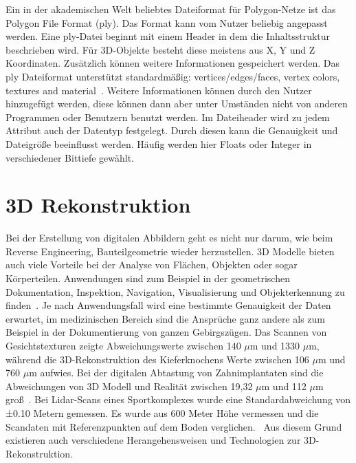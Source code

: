Ein in der akademischen Welt beliebtes Dateiformat für Polygon-Netze ist das 
Polygon File Format (ply).
Das Format kann vom Nutzer beliebig angepasst werden. Eine ply-Datei beginnt mit 
einem Header in dem die Inhaltsstruktur beschrieben wird. 
Für 3D-Objekte besteht diese meistens aus X, Y und Z Koordinaten. 
Zusätzlich können weitere Informationen gespeichert werden. Das ply Dateiformat 
unterstützt standardmäßig: \glqq vertices/edges/faces, vertex colors, textures and
material\grqq ~\cite{KentonMchenry.2008}. Weitere Informationen können durch den Nutzer 
hinzugefügt werden, 
diese können dann aber unter Umständen nicht von anderen Programmen oder Benutzern
benutzt werden.
Im Dateiheader wird zu jedem Attribut auch der Datentyp festgelegt. Durch diesen 
kann die Genauigkeit und Dateigröße beeinflusst werden. Häufig werden hier Floats oder
Integer in verschiedener Bittiefe gewählt.

\section{3D Rekonstruktion} \label{3d_construction}

Bei der Erstellung von digitalen Abbildern geht es nicht nur darum, wie beim Reverse
Engineering, Bauteilgeometrie wieder herzustellen. 3D Modelle bieten auch viele 
Vorteile bei der Analyse von Flächen, Objekten oder sogar Körperteilen. 
Anwendungen sind zum Beispiel in der
geometrischen Dokumentation, Inspektion, Navigation, Visualisierung und 
Objekterkennung zu finden~\cite{Verykokou.2023}. Je nach Anwendungsfall wird eine
bestimmte Genauigkeit
der Daten erwartet, im medizinischen Bereich sind die Ansprüche ganz 
andere als zum Beispiel in der Dokumentierung von ganzen Gebirgszügen.
Das Scannen von Gesichtstexturen zeigte Abweichungswerte zwischen 140 $\mu$m und 
1330 $\mu$m, während die 3D-Rekonstruktion des Kieferknochens Werte zwischen 106 $\mu$m 
und 760 $\mu$m aufwies. 
Bei der digitalen Abtastung von Zahnimplantaten sind die Abweichungen von 
3D Modell und Realität zwischen 19,32 $\mu$m
und 112 $\mu$m groß~\cite{Bohner.2019}.
Bei Lidar-Scans eines Sportkomplexes wurde eine Standardabweichung von ±0.10 Metern
gemessen. Es wurde aus 600 Meter Höhe vermessen und die Scandaten mit 
Referenzpunkten auf dem Boden verglichen.~\cite{Elaksher.2023}
Aus diesem Grund existieren auch verschiedene Herangehensweisen und Technologien  
zur 3D-Rekonstruktion.

